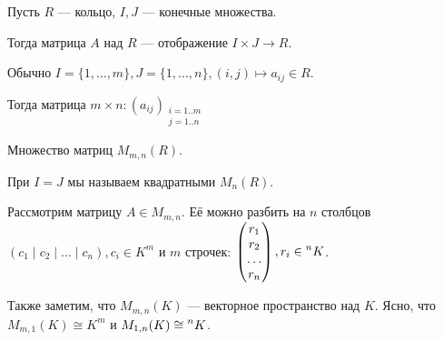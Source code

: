 \begin{definition}
    Пусть $R$ --- кольцо,  $I, J$ --- конечные множества.

    Тогда матрица $A$ над  $R$ --- отображение  $I \times J \to R$.

    Обычно  $I = \{1,\ldots, m\}, J = \{1, \ldots, n\}, (i, j) \mapsto a_{ij} \in R$.

    Тогда матрица $m \times n\!: (a_{ij})_{\substack{i=1..m \\ j = 1..n}}$
\end{definition}
\begin{definition}
    Множество матриц $M_{m, n}(R)$.

    При $I = J$ мы называем квадратными  $M_n(R)$.
\end{definition}

Рассмотрим матрицу $A \in M_{m, n}$. Её можно разбить на  $n$ столбцов  $(c_1 \mid c_2 \mid \ldots \mid c_n), c_i \in K^m$ и $m$ строчек:  $\begin{pmatrix} r_1 \\ r_2 \\ \ldots \\ r_n \end{pmatrix}, r_i \in \prescript{n}{}{K}$.

Также заметим, что $M_{m, n}(K)$ --- векторное пространство над  $K$. Ясно, что  $M_{m, 1}(K) \cong K^m$ и  $M_{1, n}(K) \cong \prescript{n}{}{K}$.


